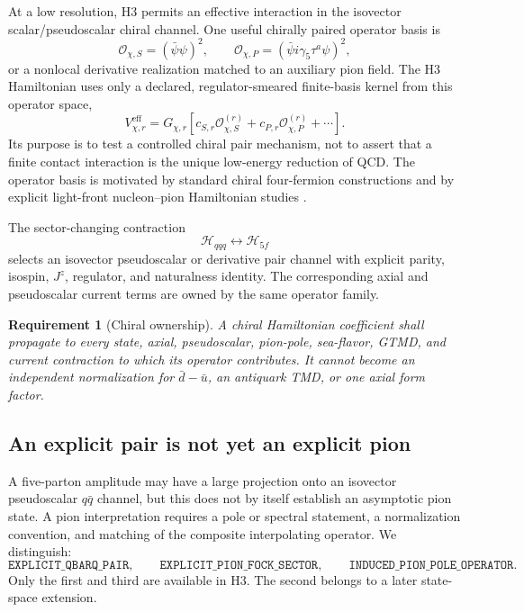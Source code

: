 \documentclass[11pt]{article}
\newtheorem{requirement}[definition]{Requirement}
\newcommand{\Hil}{\mathcal H}
\newcommand{\cO}{\mathcal O}
\newcommand{\eff}{\mathrm{eff}}
\newcommand{\Jz}{J^z}
\newcommand{\Hthree}{\Hil_{qqq}}
\begin{document}
At a low resolution, H3 permits an effective interaction in the isovector
scalar/pseudoscalar chiral channel.  One useful chirally paired operator basis
is
\begin{equation}
 \cO_{\chi,S}
 =\left(\bar\psi\psi\right)^2,
 \qquad
 \cO_{\chi,P}
 =\left(\bar\psi i\gamma_5\tau^a\psi\right)^2,
 \label{eq:chiral-pair-basis}
\end{equation}
or a nonlocal derivative realization matched to an auxiliary pion field.
The H3 Hamiltonian uses only a declared, regulator-smeared finite-basis kernel
from this operator space,
\begin{equation}
 V_{\chi,r}^{\eff}
 =G_{\chi,r}
 \left[
 c_{S,r}\cO_{\chi,S}^{(r)}
 +c_{P,r}\cO_{\chi,P}^{(r)}
 +\cdots
 \right].
 \label{eq:chiral-effective}
\end{equation}
Its purpose is to test a controlled chiral pair mechanism, not to assert that
a finite contact interaction is the unique low-energy reduction of QCD.  The
operator basis is motivated by standard chiral four-fermion constructions and
by explicit light-front nucleon--pion Hamiltonian studies
\cite{NJL1961,WuZhang2004,Du2020,Cao2026}.

The sector-changing contraction
\begin{equation}
 \Hthree\longleftrightarrow\Hil_{5f}
\end{equation}
selects an isovector pseudoscalar or derivative pair channel with explicit
parity, isospin, \(\Jz\), regulator, and naturalness identity.  The corresponding
axial and pseudoscalar current terms are owned by the same operator family.

\begin{requirement}[Chiral ownership]
A chiral Hamiltonian coefficient shall propagate to every state, axial,
pseudoscalar, pion-pole, sea-flavor, GTMD, and current contraction to which its
operator contributes.  It cannot become an independent normalization for
\(\bar d-\bar u\), an antiquark TMD, or one axial form factor.
\end{requirement}

\subsection{An explicit pair is not yet an explicit pion}

A five-parton amplitude may have a large projection onto an isovector
pseudoscalar \(q\bar q\) channel, but this does not by itself establish an
asymptotic pion state.  A pion interpretation requires a pole or spectral
statement, a normalization convention, and matching of the composite
interpolating operator.  We distinguish:
\begin{equation}
 \texttt{EXPLICIT\_QBARQ\_PAIR},
 \qquad
 \texttt{EXPLICIT\_PION\_FOCK\_SECTOR},
 \qquad
 \texttt{INDUCED\_PION\_POLE\_OPERATOR}.
\end{equation}
Only the first and third are available in H3.  The second belongs to a later
state-space extension.
\end{document}

